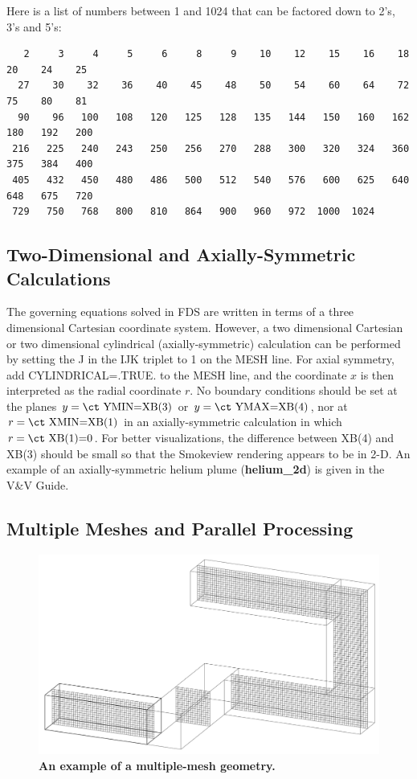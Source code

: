 \documentclass[11pt]{book}
\begin{document}
Here is a list of numbers between 1 and 1024 that can be factored
down to 2's, 3's and 5's:

\footnotesize
\begin{verbatim}
   2     3     4     5     6     8     9    10    12    15    16    18    20    24    25
  27    30    32    36    40    45    48    50    54    60    64    72    75    80    81
  90    96   100   108   120   125   128   135   144   150   160   162   180   192   200
 216   225   240   243   250   256   270   288   300   320   324   360   375   384   400
 405   432   450   480   486   500   512   540   576   600   625   640   648   675   720
 729   750   768   800   810   864   900   960   972  1000  1024
\end{verbatim}
\normalsize


\subsection{Two-Dimensional and Axially-Symmetric Calculations}
\label{info:2D}

The governing equations solved in FDS are written in terms of a
three dimensional Cartesian coordinate system. However,
a two dimensional Cartesian or two dimensional cylindrical
(axially-symmetric) calculation can be performed by setting the {\ct J} in the {\ct IJK} triplet
to 1 on the {\ct MESH} line. For axial symmetry, add {\ct CYLINDRICAL=.TRUE.} to the
{\ct MESH} line, and the coordinate $x$ is then interpreted as the radial coordinate $r$.
No boundary conditions should be set at the planes $y=\hbox{\ct YMIN=XB(3)}$ or
$y=\hbox{\ct YMAX=XB(4)}$, nor at $r=\hbox{\ct XMIN=XB(1)}$ in an axially-symmetric
calculation in which $r=\hbox{\ct XB(1)=0}$. For better visualizations, the difference between
{\ct XB(4)} and {\ct XB(3)} should be small so that the Smokeview rendering appears to be in 2-D.
An example of an axially-symmetric helium plume ({\bf helium\_2d}) is given in the V\&V Guide.


\subsection{Multiple Meshes and Parallel Processing}
\label{info:multimesh}

\begin{figure}[ht!]
\includegraphics[width=\textwidth]{FIGURES/hallways}
\caption{\bf An example of a multiple-mesh geometry.}
\label{fig:domain}
\end{figure}
\end{document}

